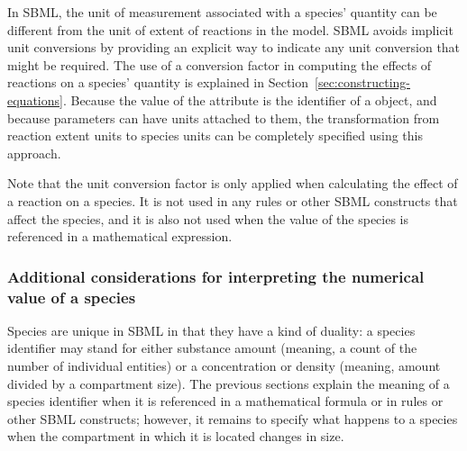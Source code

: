 In SBML, the unit of measurement associated with a species'
quantity can be different from the unit of extent of reactions in
the model.  SBML avoids implicit unit conversions by providing an
explicit way to indicate any unit conversion that might be
required.  The use of a conversion factor in computing the effects
of reactions on a species' quantity is explained in
Section~\ref{sec:constructing-equations}.  Because the value of
the  attribute is the identifier of a
\Parameter object, and because parameters can have units attached
to them, the transformation from reaction extent units to species
units can be completely specified using this approach.

Note that the unit conversion factor is only applied when
calculating the effect of a reaction on a species.  It is not used
in any rules or other SBML constructs that affect the species, and
it is also not used when the value of the species is referenced in
a mathematical expression.


\subsubsection{Additional considerations for interpreting the
  numerical value of a species}
\label{sec:species-meaning}

Species are unique in SBML in that they have a kind of duality: a
species identifier may stand for either substance amount (meaning,
a count of the number of individual entities) or a concentration
or density (meaning, amount divided by a compartment size).  The
previous sections explain the meaning of a species identifier when
it is referenced in a mathematical formula or in rules or other
SBML constructs; however, it remains to specify what happens to a
species when the compartment in which it is located changes in
size.

